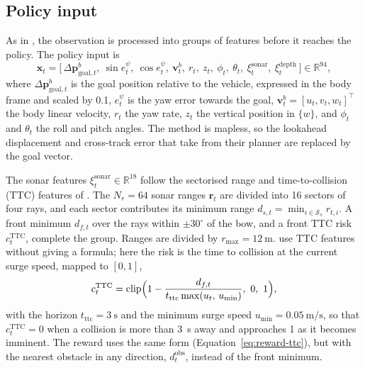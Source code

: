 \subsection{Policy input}
\label{sec:policy-input}
As in \textcite[Eq.~13]{deowan2026unified}, the observation is processed into groups of features before it reaches the policy. The policy input is
\begin{equation}
  \mathbf{x}_t = \bigl[\, \Delta\mathbf{p}^b_{\mathrm{goal},t},\ \sin e^\psi_t,\ \cos e^\psi_t,\ \mathbf{v}^b_t,\ r_t,\ z_t,\ \phi_t,\ \theta_t,\ \xi^{\mathrm{sonar}}_t,\ \xi^{\mathrm{depth}}_t \,\bigr] \in \mathbb{R}^{94},
  \label{eq:policy-input}
\end{equation}
where $\Delta\mathbf{p}^b_{\mathrm{goal},t}$ is the goal position relative to the vehicle, expressed in the body frame and scaled by 0.1, $e^\psi_t$ is the yaw error towards the goal, $\mathbf{v}^b_t = [u_t, v_t, w_t]^\top$ the body linear velocity, $r_t$ the yaw rate, $z_t$ the vertical position in $\{w\}$, and $\phi_t$ and $\theta_t$ the roll and pitch angles. The method is mapless, so the lookahead displacement and cross-track error that \textcite{deowan2026unified} take from their planner are replaced by the goal vector.

The sonar features $\xi^{\mathrm{sonar}}_t \in \mathbb{R}^{18}$ follow the sectorised range and time-to-collision (TTC) features of \textcite{deowan2026unified}. The $N_r = 64$ sonar ranges $\mathbf{r}_t$ are divided into 16 sectors of four rays, and each sector contributes its minimum range $d_{s,t} = \min_{i \in \mathcal{S}_s} r_{t,i}$. A front minimum $d_{f,t}$ over the rays within $\pm 30^\circ$ of the bow, and a front TTC risk $c^{\mathrm{TTC}}_t$, complete the group. Ranges are divided by $r_{\max} = \SI{12}{\metre}$. \textcite{deowan2026unified} use TTC features without giving a formula; here the risk is the time to collision at the current surge speed, mapped to $[0,1]$,
\begin{equation}
  c^{\mathrm{TTC}}_t = \operatorname{clip}\Bigl(1 - \frac{d_{f,t}}{t_{\mathrm{ttc}}\max(u_t,\,u_{\min})},\ 0,\ 1\Bigr),
  \label{eq:ttc-risk}
\end{equation}
with the horizon $t_{\mathrm{ttc}} = \SI{3}{\second}$ and the minimum surge speed $u_{\min} = \SI{0.05}{\metre\per\second}$, so that $c^{\mathrm{TTC}}_t = 0$ when a collision is more than \SI{3}{\second} away and approaches 1 as it becomes imminent. The reward uses the same form (Equation~\eqref{eq:reward-ttc}), but with the nearest obstacle in any direction, $d^{\mathrm{obs}}_t$, instead of the front minimum.

